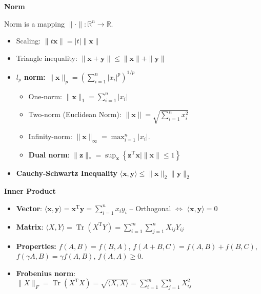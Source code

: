{\LARGE \textbf{Norm}}

Norm is a mapping $\|\cdot\|: \mathbb{R}^{n} \rightarrow \mathbb{R}$.
\begin{itemize}
    \item Scaling: $\|t \bm{x}\|=|t|\|\bm{x}\|$
    \item Triangle inequality: $\|\bm{x}+\bm{y}\| \leq\|\bm{x}\|+\|\bm{y}\|$

\item \textbf{$l_p$ norm:}
$\|\bm{x}\|_{p}=\left(\sum_{i=1}^{n}\left|x_{i}\right|^{p}\right)^{1 / p}$

\begin{itemize}
    \item One-norm: $\|\bm{x}\|_{1}=\sum_{i=1}^{n}\left|x_{i}\right|$
    \item Two-norm (Euclidean Norm): $\|\bm{x}\|=\sqrt{\sum_{i=1}^{n} x_{i}^{2}}$ 
    \item Infinity-norm: $\|\bm{x}\|_{\infty}=\max _{i=1}^{n}\left|x_{i}\right| .$
    \item \textbf{Dual norm}:
    $\|\bm{z}\|_{*}=\sup _{\bm{x}}\left\{\bm{z}^{\mathrm{T}} \bm{x} \mid\|\bm{x}\| \leq 1\right\}$
\end{itemize}


\item \textbf{Cauchy-Schwartz Inequality} $\langle\bm{x}, \bm{y}\rangle \leq\|\bm{x}\|_{2}\|\bm{y}\|_{2}$

\end{itemize}



{\LARGE \textbf{Inner Product}}
\begin{itemize}

\item \textbf{Vector}: $\langle\bm{x}, \bm{y}\rangle=\bm{x}^{\mathrm{T}} \bm{y}=\sum_{i=1}^{n} x_{i} y_{i}$
\subitem -- Orthogonal $\Leftrightarrow$ $\langle\bm{x}, \bm{y}\rangle=0$

\item \textbf{Matrix}: $\langle X, Y\rangle=\operatorname{Tr}\left(X^{\mathrm{T}} Y\right)=\sum_{i=1}^{m} \sum_{j=1}^{n} X_{i j} Y_{i j}$

\item \textbf{Properties:} $f(A, B)=f(B, A)$, $f(A+B, C)=f(A, B)+f(B, C)$, $f(\gamma A, B)=\gamma f(A, B)$, $f(A, A) \geq 0$. 


\item \textbf{Frobenius norm}:\\
$\|X\|_{F}=\operatorname{Tr}\left(X^{\mathrm{T}} X\right)=\sqrt{\langle X, X\rangle}=\sum_{i=1}^{m} \sum_{j=1}^{n} X_{i j}^{2}$




\end{itemize}








